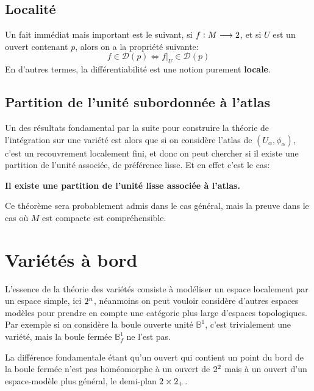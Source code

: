    \section{Localité}
   Un fait immédiat mais important est le suivant, si \( f : M \longrightarrow 2 \), et si \( U \) est un ouvert contenant \( p \), alors on a la propriété suivante:
   \[ 
      f \in \mathcal{D}(p) \iff f\big|_U \in \mathcal{D}(p)
   \]
   En d'autres termes, la différentiabilité est une notion purement \textbf{locale}.  
   \section{Partition de l'unité subordonnée à l'atlas}
      Un des résultats fondamental par la suite pour construire la théorie de l'intégration sur une variété est alors que si on considère l'atlas de \((U_\alpha, \phi_\alpha) \), c'est un recouvrement localement fini, et donc on peut chercher si il existe une partition de l'unité associée, de préférence lisse. Et en effet c'est le cas:
      \begin{center}
         \textbf{Il existe une partition de l'unité lisse associée à l'atlas.}
      \end{center}
      Ce théorème sera probablement admis dans le cas général, mais la preuve dans le cas où \( M \) est compacte est compréhensible.
\chapter{Variétés à bord}
   L'essence de la théorie des variétés consiste à modéliser un espace localement par un espace simple, ici \( 2^n \), néanmoins on peut vouloir considère d'autres espaces modèles pour prendre en compte une catégorie plus large d'espaces topologiques. Par exemple si on considère la boule ouverte unité \( \mathbb{B}^1 \), c'est trivialement une variété, mais la boule fermée \( \mathbb{B}_f^1 \) ne l'est pas.\<
   
   La différence fondamentale étant qu'un ouvert qui contient un point du bord de la boule fermée n'est pas homéomorphe à un ouvert de \( 2^2 \) mais à un ouvert d'un espace-modèle plus général, le demi-plan \( 2 \times 2_+ \).
